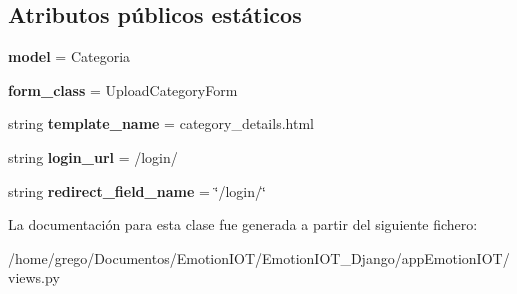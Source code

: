 \subsection*{Atributos públicos estáticos}
\begin{DoxyCompactItemize}
\item 
{\bfseries model} = Categoria\hypertarget{classappEmotionIOT_1_1views_1_1Update__category_a914b8433c3c4a769509abe92ae77aacf}{}\label{classappEmotionIOT_1_1views_1_1Update__category_a914b8433c3c4a769509abe92ae77aacf}

\item 
{\bfseries form\+\_\+class} = Upload\+Category\+Form\hypertarget{classappEmotionIOT_1_1views_1_1Update__category_a058cc376d3bdea152e84232ad47d151d}{}\label{classappEmotionIOT_1_1views_1_1Update__category_a058cc376d3bdea152e84232ad47d151d}

\item 
string {\bfseries template\+\_\+name} = \textquotesingle{}category\+\_\+details.\+html\textquotesingle{}\hypertarget{classappEmotionIOT_1_1views_1_1Update__category_ad747c7c6b24207bcd3776fd0209284c8}{}\label{classappEmotionIOT_1_1views_1_1Update__category_ad747c7c6b24207bcd3776fd0209284c8}

\item 
string {\bfseries login\+\_\+url} = \textquotesingle{}/login/\textquotesingle{}\hypertarget{classappEmotionIOT_1_1views_1_1Update__category_a702adc32098a50ef1888d4fb3bab4ec9}{}\label{classappEmotionIOT_1_1views_1_1Update__category_a702adc32098a50ef1888d4fb3bab4ec9}

\item 
string {\bfseries redirect\+\_\+field\+\_\+name} = \char`\"{}/login/\char`\"{}\hypertarget{classappEmotionIOT_1_1views_1_1Update__category_a5a52b7f2e954a6cb046e7a04370e9818}{}\label{classappEmotionIOT_1_1views_1_1Update__category_a5a52b7f2e954a6cb046e7a04370e9818}

\end{DoxyCompactItemize}


La documentación para esta clase fue generada a partir del siguiente fichero\+:\begin{DoxyCompactItemize}
\item 
/home/grego/\+Documentos/\+Emotion\+I\+O\+T/\+Emotion\+I\+O\+T\+\_\+\+Django/app\+Emotion\+I\+O\+T/views.\+py\end{DoxyCompactItemize}
